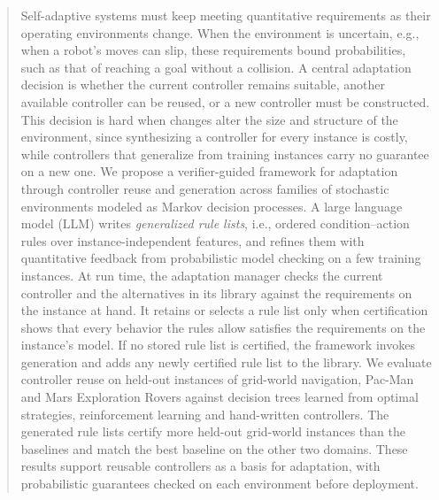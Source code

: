 
\begin{abstract}
Self-adaptive systems must keep meeting quantitative requirements as their operating environments change.
When the environment is uncertain, e.g., when a robot's moves can slip, these requirements bound probabilities, such as that of reaching a goal without a collision.
A central adaptation decision is whether the current controller remains suitable, another available controller can be reused, or a new controller must be constructed.
This decision is hard when changes alter the size and structure of the environment, since synthesizing a controller for every instance is costly, while controllers that generalize from training instances carry no guarantee on a new one.
We propose a verifier-guided framework for adaptation through controller reuse and generation across families of stochastic environments modeled as Markov decision processes.
A large language model (LLM) writes \textit{generalized rule lists}, i.e., ordered condition--action rules over instance-independent features, and refines them with quantitative feedback from probabilistic model checking on a few training instances.
At run time, the adaptation manager checks the current controller and the alternatives in its library against the requirements on the instance at hand.
It retains or selects a rule list only when certification shows that every behavior the rules allow satisfies the requirements on the instance's model.
If no stored rule list is certified, the framework invokes generation and adds any newly certified rule list to the library.
We evaluate controller reuse on held-out instances of grid-world navigation, Pac-Man and Mars Exploration Rovers against decision trees learned from optimal strategies, reinforcement learning and hand-written controllers.
The generated rule lists certify more held-out grid-world instances than the baselines and match the best baseline on the other two domains.
These results support reusable controllers as a basis for adaptation, with probabilistic guarantees checked on each environment before deployment.
\end{abstract}

